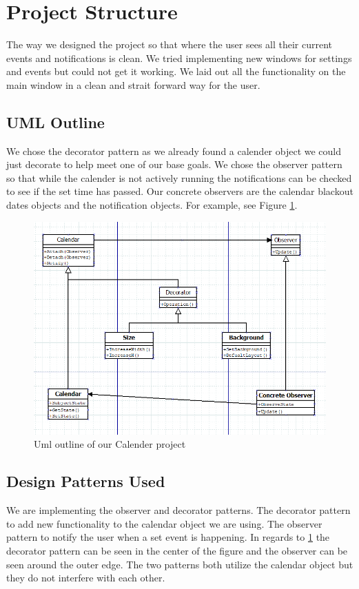 \documentclass[10pt,conference,onecolumn,compsoc]{IEEEtran}
\begin{document}
\section{Project Structure}
The way we designed the project so that where the user sees all their current events and notifications is clean. We tried implementing new windows for settings and events but could not get it working. We laid out all the functionality on the main window in a clean and strait forward way for the user. 

\subsection{UML Outline}
We chose the decorator pattern as we already found a calender object we could just decorate to help meet one of our base goals. We chose the observer pattern so that while the calender is not actively running the notifications can be checked to see if the set time has passed. Our concrete observers are the calendar blackout dates objects and the notification objects.
For example, see Figure \ref{UML of Calender Project}.

\begin{figure}[ht!]
\includegraphics[scale=0.8]{Uml Format.png}
\caption{Uml outline of our Calender project}
\label{UML of Calender Project}
\end{figure}

\subsection{Design Patterns Used}
We are implementing the observer and decorator patterns. The decorator pattern to add new functionality to the calendar object we are using. The observer pattern to notify the user when a set event is happening. In regards to \ref{UML of Calender Project} the decorator pattern can be seen in the center of the figure and the observer can be seen around the outer edge. The two patterns both utilize the calendar object but they do not interfere with each other. 
\end{document}

